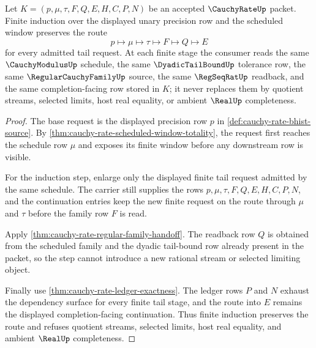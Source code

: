 \begin{theorem}
\label{thm:cauchy-rate-finite-tail-induction}
Let $K=(p,\mu,\tau,F,Q,E,H,C,P,N)$ be an accepted $\CauchyRateUp$ packet. Finite induction over the displayed unary precision row and the scheduled window preserves the route
$$
p \longmapsto \mu \longmapsto \tau \longmapsto F \longmapsto Q \longmapsto E
$$
for every admitted tail request. At each finite stage the consumer reads the same $\CauchyModulusUp$ schedule, the same $\DyadicTailBoundUp$ tolerance row, the same $\RegularCauchyFamilyUp$ source, the same $\RegSeqRatUp$ readback, and the same completion-facing row stored in $K$; it never replaces them by quotient streams, selected limits, host real equality, or ambient $\RealUp$ completeness.
\end{theorem}
\begin{proof}
The base request is the displayed precision row $p$ in \autoref{def:cauchy-rate-bhist-source}. By \autoref{thm:cauchy-rate-scheduled-window-totality}, the request first reaches the schedule row $\mu$ and exposes its finite window before any downstream row is visible.

For the induction step, enlarge only the displayed finite tail request admitted by the same schedule. The carrier still supplies the rows $p,\mu,\tau,F,Q,E,H,C,P,N$, and the continuation entries keep the new finite request on the route through $\mu$ and $\tau$ before the family row $F$ is read.

Apply \autoref{thm:cauchy-rate-regular-family-handoff}. The readback row $Q$ is obtained from the scheduled family and the dyadic tail-bound row already present in the packet, so the step cannot introduce a new rational stream or selected limiting object.

Finally use \autoref{thm:cauchy-rate-ledger-exactness}. The ledger rows $P$ and $N$ exhaust the dependency surface for every finite tail stage, and the route into $E$ remains the displayed completion-facing continuation. Thus finite induction preserves the route and refuses quotient streams, selected limits, host real equality, and ambient $\RealUp$ completeness.
\end{proof}

